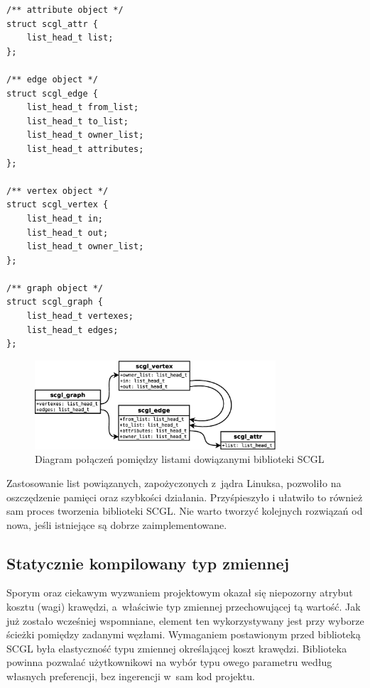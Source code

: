 \documentclass[a4paper,12pt,polish,oneside]{thesis}
\begin{document}
\begin{lstlisting}[style=code,caption=Zastosowanie Linux Kernel List na przykładzie struktur biblioteki SCGL]
/** attribute object */
struct scgl_attr {
	list_head_t list;
};

/** edge object */
struct scgl_edge {
	list_head_t from_list;
	list_head_t to_list;
	list_head_t owner_list;
	list_head_t attributes;
};

/** vertex object */
struct scgl_vertex {
	list_head_t in;
	list_head_t out;
	list_head_t owner_list;
};

/** graph object */
struct scgl_graph {
	list_head_t vertexes;
	list_head_t edges;
};
\end{lstlisting}

\begin{figure}[htb]
	\begin{center}
		\includegraphics[width=0.80\textwidth]{listconnection.eps}
		\caption{Diagram połączeń pomiędzy listami dowiązanymi biblioteki SCGL}
	\end{center}
\end{figure}

Zastosowanie list powiązanych, zapożyczonych z~jądra Linuksa, pozwoliło na oszczędzenie pamięci oraz szybkości działania.
Przyśpieszyło i ułatwiło to również sam proces tworzenia biblioteki SCGL.
Nie warto tworzyć kolejnych rozwiązań od nowa, jeśli istniejące są dobrze zaimplementowane.

\subsection{Statycznie kompilowany typ zmiennej}
Sporym oraz ciekawym wyzwaniem projektowym okazał się niepozorny atrybut kosztu (wagi) krawędzi, a~właściwie typ zmiennej przechowującej tą wartość.
Jak już zostało wcześniej wspomniane, element ten wykorzystywany jest przy wyborze ścieżki pomiędzy zadanymi węzłami.
Wymaganiem postawionym przed biblioteką SCGL była elastyczność typu zmiennej określającej koszt krawędzi.
Biblioteka powinna pozwalać użytkownikowi na wybór typu owego parametru według własnych preferencji, bez ingerencji w~sam kod projektu.
\end{document}
